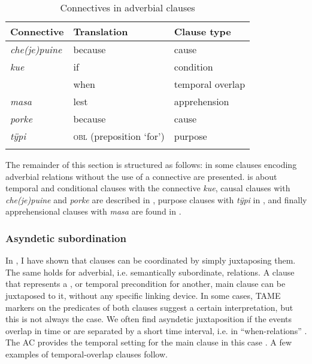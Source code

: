 \begin{table}
\caption{Connectives in adverbial clauses}

\begin{tabularx}{\textwidth}{QQl}
\lsptoprule
Connective & Translation & Clause type \\
\midrule
\textit{che(je)puine} & because & cause\\
\textit{kue} & if & condition\\
& when & temporal overlap\\
\textit{masa} & lest & apprehension\\
\textit{porke} & because & cause\\
\textit{tÿpi} & \textsc{obl} (preposition ‘for’) & purpose \\
\lspbottomrule
\end{tabularx}

\label{table:Connectives_AC}
\end{table}


The remainder of this section is structured as follows: in  some clauses encoding adverbial relations without the use of a connective are presented.  is about temporal and conditional clauses with the connective \textit{kue}, causal clauses with \textit{che(je)puine} and \textit{porke} are described in , purpose clauses with \textit{tÿpi} in , and finally apprehensional clauses with \textit{masa} are found in . 

\subsubsection{Asyndetic subordination}\label{sec:AsyndeticSubordination}

In , I have shown that clauses can be coordinated by simply juxtaposing them. The same holds for adverbial, i.e. semantically subordinate, relations. A clause that represents a ,  or temporal precondition for another, main clause can be juxtaposed to it, without any specific linking device. In some cases, TAME markers on the predicates of both clauses suggest a certain interpretation, but this is not always the case. We often find asyndetic juxtaposition if the events overlap in time or are separated by a short time interval, i.e. in “when-relations” \citep[159]{Cristofaro2003}. The AC provides the temporal setting for the main clause in this case \citep[cf.][155]{Cristofaro2003}. A few examples of temporal-overlap clauses follow.

